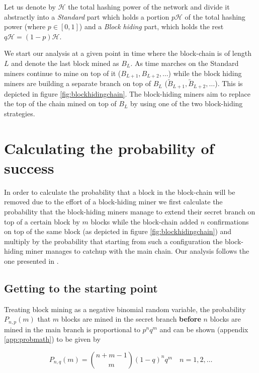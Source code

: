 \documentclass[letterpaper,12pt]{report}
\begin{document}
Let us denote by $\mathcal{H}$ the total hashing power of the network and divide it abstractly into a \emph{Standard} part which holds a portion $p\mathcal{H}$ of the total hashing power (where $p \in [0,1]$) and a \emph{Block hiding} part, which holds the rest $q\mathcal{H}=(1-p)\mathcal{H}$. 

We start our analysis at a given point in time where the block-chain is of length $L$ and denote the last block mined as $\mathit{B}_L$. As time marches on the Standard miners continue to mine on top of it ($\mathit{B}_{L+1}, \mathit{B}_{L+2}, \dots$) while the block hiding miners are building a separate branch on top of $\mathit{B}_L$ ($\mathit{\tilde{B}}_{L+1}, \mathit{\tilde{B}}_{L+2}, \dots$). This is depicted in figure \ref{fig:blockhidingchain}. The block-hiding miners aim to replace the top of the chain mined on top of $\mathit{B}_L$ by using one of the two block-hiding strategies.


\section{Calculating the probability of success}

In order to calculate the probability that a block in the block-chain will be removed due to the effort of a block-hiding miner we first calculate the probability that the block-hiding miners manage to extend their secret branch on top of a certain block by $m$ blocks while the block-chain added $n$ confirmations on top of the same block (as depicted in figure \ref{fig:blockhidingchain}) and multiply by the probability that starting from such a configuration the block-hiding miner manages to catchup with the main chain. Our analysis follows the one presented in \cite{Doublespend}.

\subsection{Getting to the starting point}
Treating block mining as a negative binomial random variable, the probability $\mathit{P_{n,p}(m)}$ that $m$ blocks are mined in the secret branch {\bf before} $n$ blocks are mined in the main branch is proportional to $p^nq^m$ and can be shown
(appendix \ref{app:probmath}) to be given by

\begin{equation}\label{eq:pnm}
\mathit{P}_{n,q}(m)={n + m -1\choose m}(1-q)^nq^m \quad n=1,2,\dots
\end{equation}
\end{document}
